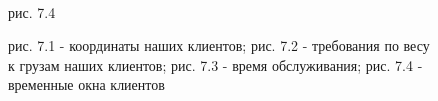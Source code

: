 \documentclass{article}
\begin{document}
\begin{figure}[H]
\begin{minipage}[h]{0.41\linewidth}
 \\рис. 7.4
\end{minipage}
\caption{рис. 7.1 - координаты наших клиентов; рис. 7.2 - требования по весу к грузам наших клиентов; рис. 7.3 - время обслуживания; рис. 7.4 - временные окна клиентов}
\end{figure}
\end{document}
